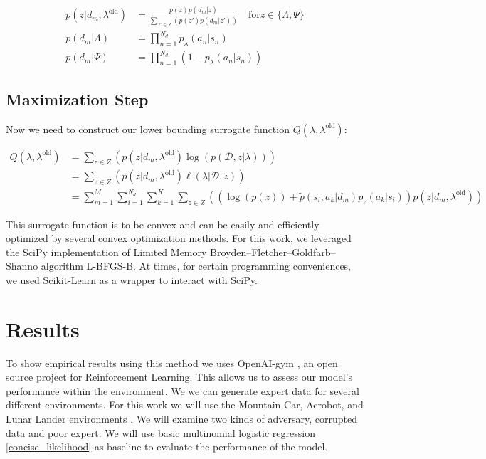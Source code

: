 \documentclass[11pt]{article}
\newcommand{\data}{\mathcal{D}}
\newcommand{\old}{\text{old}}
\newcommand{\for}{\text{for}}
\begin{document}
\begin{equation}
    \label{contributions}
    \begin{aligned}
        p(z|d_{m}, \lambda^{\old}) &= \frac{p(z)p(d_{m}|z)}{\sum_{z' \in Z} \left(
        p(z')p(d_{m}|z')
        \right)} \quad \for z \in \{\Lambda, \Psi\}  \\
        p(d_{m}|\Lambda) &= \prod_{n=1}^{N_{d}} p_{\lambda}(a_{n}|s_{n}) \\
        p(d_{m}|\Psi) &= \prod_{n=1}^{N_{d}} \left( 1 - p_{\lambda}(a_{n}|s_{n}) \right)
    \end{aligned}
\end{equation}

\subsection{Maximization Step}


Now we need to construct our lower bounding surrogate function $Q(\lambda, \lambda^{\old})$:

\begin{equation}
    \label{surrogate}
    \begin{aligned}
        Q(\lambda, \lambda^{\old}) &= \sum_{z \in Z} \left( p(z|d_{m},\lambda^{\old}) \log(p(\data, z| \lambda))  \right) \\
        &= \sum_{z \in Z} \left( p(z|d_{m},\lambda^{\old}) \ell(\lambda| \data, z) \right) \\
        &= \sum_{m=1}^{M}\sum_{i=1}^{N_{d}} \sum_{k=1}^{K} \sum_{z \in Z} \left(\left( \log(p(z)) + \widetilde{p}(s_{i}, a_{k}| d_{m})p_{z}(a_{k}|s_{i}) \right) p(z|d_{m}, \lambda^{\old}) \right)
    \end{aligned}  
\end{equation}

This surrogate function is to be convex and can be easily and efficiently optimized by several convex optimization methods. For this work, we leveraged the SciPy \cite{2020SciPy-NMeth} implementation of Limited Memory Broyden–Fletcher–Goldfarb–Shanno algorithm L-BFGS-B. At times, for certain programming conveniences, we used Scikit-Learn \cite{scikit-learn} as a wrapper to interact with SciPy.
 
 \section{Results}
 
 \quad To show empirical results using this method we uses OpenAI-gym \cite{brockman2016openai}, an open source project for Reinforcement Learning. This allows us to assess our model's performance within the environment. We we can generate expert data for several different environments. For this work we will use the Mountain Car, Acrobot, and Lunar Lander environments \cite{brockman2016openai}. We will examine two kinds of adversary, corrupted data and poor expert. We will use basic multinomial logistic regression \eqref{concise_likelihood} as baseline to evaluate the performance of the model.
 
\end{document}
